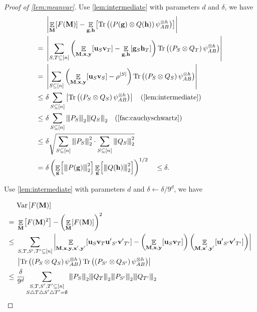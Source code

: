 \documentclass[10pt,a4paper]{article}
\theoremstyle{plain}
\theoremstyle{definition}
\newcommand {\minusspace} {\: \! \!}
\newcommand {\Fn} [2] {\ensuremath{ #1 \minusspace \Br{ #2 } }}
\newcommand {\br} [1] {\ensuremath{ \left( #1 \right) }}
\newcommand {\Br} [1] {\ensuremath{ \left[ #1 \right] }}
\newcommand {\ab} [1] {\ensuremath{ \left| #1 \right| }}
\DeclareMathOperator*{\bigE}{\mathbb{E}}
\newcommand {\expec} [2] {\Fn{\bigE_{\substack{#1}}}{#2}}
\newcommand{\nnorm}[1]{{\left\vert\kern-0.25ex\left\vert\kern-0.25ex\left\vert #1
		\right\vert\kern-0.25ex\right\vert\kern-0.25ex\right\vert}}
\newcommand {\Tr} {\ensuremath{ \mathrm{Tr} }}
\newcommand{\randg}{\ensuremath{\mathbf{g}}}
\newcommand{\randh}{\ensuremath{\mathbf{h}}}
\newcommand{\randu}{\ensuremath{\mathbf{u}}}
\newcommand{\randv}{\ensuremath{\mathbf{v}}}
\newcommand {\var} [1] {\mathrm{Var}\Br{#1}}
\newcommand{\1}{\mathbb{1}} %
\begin{document}
\begin{proof}[Proof of \cref{lem:meanvar}]
Use \cref{lem:intermediate} with parameters $d$ and $\delta$, we have 
\begin{align*}
&\ab{\expec{\mathbf{M}}{F(\mathbf{M})}-\expec{\mathbf{g},\mathbf{h}}{\Tr\br{\br{P(\randg)\otimes Q(\randh)}\psi_{AB}^{\otimes h}}}}\\
=~&\ab{\sum_{S,T\subseteq[n]}\br{\expec{\mathbf{M},\mathbf{x},\mathbf{y}}{\mathbf\randu_S\mathbf\randv_T}-\expec{\mathbf{g},\mathbf{h}}{\mathbf{g}_S\mathbf{h}_T}}\Tr\br{\br{ P_S\otimes Q_T}\psi_{AB}^{\otimes h}}}\\
=~&\ab{\sum_{S\subseteq[n]}\br{\expec{\mathbf{M},\mathbf{x},\mathbf{y}}{\mathbf\randu_S\mathbf\randv_S}-\rho^{\ab{S}}}\Tr\br{\br{ P_S\otimes Q_S}\psi_{AB}^{\otimes h}}}\\
\leq~&\delta\sum_{S\subseteq[n]}\ab{\Tr\br{\br{ P_S\otimes Q_S}\psi_{AB}^{\otimes h}}}\quad\mbox{(\cref{lem:intermediate})}\\
\leq~&\delta\sum_{S\subseteq[n]}\nnorm{ P_S}_2\nnorm{ Q_S}_2\quad\mbox{(\cref{fac:cauchyschwartz})}\\
\leq~&\delta\sqrt{\sum_{S\subseteq[n]}\nnorm{ P_S}_2^2\cdot\sum_{S\subseteq[n]}\nnorm{ Q_S}_2^2}\\
=~&\delta \br{\expec{\randg}{\nnorm{P(\randg)}_2^2}\expec{\randg}{\nnorm{Q(\randh)}_2^2}}^{1/2}\quad\leq\delta.\\
\end{align*}

Use \cref{lem:intermediate} with parameters $d$ and $\delta\leftarrow\delta/9^d$, we have 

\begin{align*}
&\var{F(\mathbf{M})}\\
=~&\expec{\mathbf{M}}{F(\mathbf{M})^2}-\br{\expec{\mathbf{M}}{F(\mathbf{M})}}^2\\
\leq~&\sum_{S,T,S',T'\subseteq[n]}\ab{\expec{\mathbf{M},\mathbf{x},\mathbf{y},\mathbf{x'},\mathbf{y'}}{\mathbf\randu_S\mathbf\randv_T\mathbf{u'}_{S'}\mathbf{v'}_{T'}}-\br{\expec{\mathbf{M},\mathbf{x},\mathbf{y}}{\mathbf\randu_S\mathbf\randv_T}}\br{\expec{\mathbf{M},\mathbf{x'},\mathbf{y'}}{\mathbf{u'}_{S'}\mathbf{v'}_{T'}}}}\\
&\ab{\Tr\br{\br{ P_S\otimes Q_S}\psi_{AB}^{\otimes h}}\Tr\br{\br{ P_{S'}\otimes Q_{S'}}\psi_{AB}^{\otimes h}}}\\
\leq~&\frac{\delta}{9^d}\sum_{\substack{S,T,S',T'\subseteq[n]\\ S\bigtriangleup T\bigtriangleup S'\bigtriangleup T'=\emptyset}}\nnorm{ P_S}_2\nnorm{ Q_T}_2\nnorm{ P_{S'}}_2\nnorm{ Q_{T'}}_2
\end{align*}


\end{proof}
\end{document}
